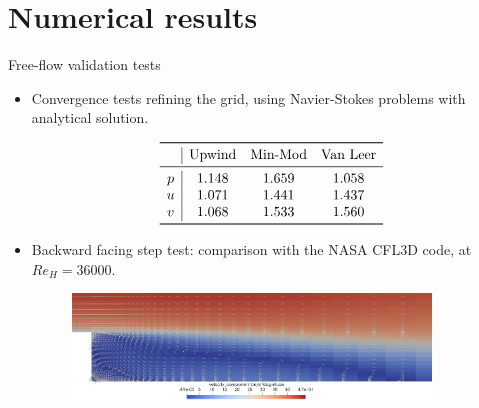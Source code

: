 \documentclass{beamer}
\begin{document}
\section{Numerical results}
\begin{frame}{Free-flow validation tests}
\begin{itemize}
	\item Convergence tests refining the grid, using Navier-Stokes problems 
	with analytical solution.
	\vspace{-0.3cm}
	\begin{table}\scriptsize
		\[
		\begin{array}{c|ccc}
		\toprule
		& \text{Upwind} & \text{Min-Mod} & \text{Van Leer} \\ 
		\midrule
		p & 1.148 & 1.659 & 1.058\\
		u & 1.071 & 1.441 & 1.437\\
		v & 1.068 & 1.533 & 1.560\\
		\bottomrule
		\end{array}
		\]
	\end{table}
	\item Backward facing step test: comparison with the NASA CFL3D code, at 
	$Re_H=36000$.
	\begin{figure}
		\centering
		\includegraphics[width=0.9\textwidth]{bfs_glimphs.png}
	\end{figure}
\end{itemize}
\end{frame}
%	
\end{document}
